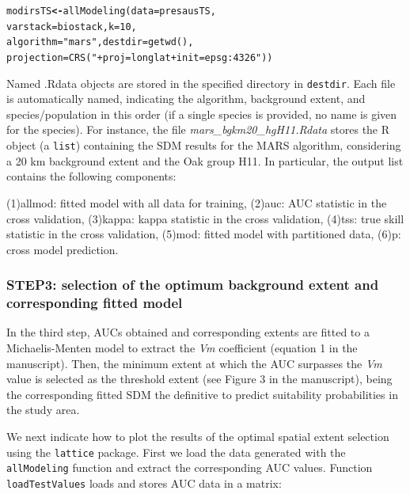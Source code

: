 \documentclass[10pt,a4paper]{article}\usepackage[]{graphicx}\usepackage[]{color}
\makeatletter
\newcommand{\hlnum}[1]{\textcolor[rgb]{0.533,0,0.133}{#1}}%
\newcommand{\hlstr}[1]{\textcolor[rgb]{0.667,0.267,0}{#1}}%
\newcommand{\hlstd}[1]{\textcolor[rgb]{0,0,0}{#1}}%
\newcommand{\hlkwb}[1]{\textcolor[rgb]{0,0,0.4}{\textbf{#1}}}%
\newcommand{\hlkwc}[1]{\textcolor[rgb]{0,0,0.4}{#1}}%
\newcommand{\hlkwd}[1]{\textcolor[rgb]{0,0.267,0.4}{#1}}%
\newenvironment{kframe}{%
 \def\at@end@of@kframe{}%
 \ifinner\ifhmode%
  \def\at@end@of@kframe{\end{minipage}}%
  \begin{minipage}{\columnwidth}%
 \fi\fi%
 \def\FrameCommand##1{\hskip\@totalleftmargin \hskip-\fboxsep
 \colorbox{shadecolor}{##1}\hskip-\fboxsep
     \hskip-\linewidth \hskip-\@totalleftmargin \hskip\columnwidth}%
 \MakeFramed {\advance\hsize-\width
   \@totalleftmargin\z@ \linewidth\hsize
   \@setminipage}}%
 {\par\unskip\endMakeFramed%
 \at@end@of@kframe}
\newenvironment{knitrout}{}{} %
\makeatother
\begin{document}
\begin{knitrout}
\color{fgcolor}\begin{kframe}
\begin{alltt}
\hlstd{modirsTS} \hlkwb{<-} \hlkwd{allModeling}\hlstd{(}\hlkwc{data} \hlstd{= presausTS,}
                     \hlkwc{varstack} \hlstd{= biostack,} \hlkwc{k} \hlstd{=} \hlnum{10}\hlstd{,}
                     \hlkwc{algorithm} \hlstd{=} \hlstr{"mars"}\hlstd{,} \hlkwc{destdir} \hlstd{=} \hlkwd{getwd}\hlstd{(),}
                \hlkwc{projection} \hlstd{=} \hlkwd{CRS}\hlstd{(}\hlstr{"+proj=longlat +init=epsg:4326"}\hlstd{))}
\end{alltt}
\end{kframe}
\end{knitrout}

Named .Rdata objects are stored in the specified directory in \texttt{destdir}. Each file is automatically named, indicating the algorithm, background extent, and species/population in this order (if a single species is provided, no name is given for the species). For instance, the file \textit{mars\_bgkm20\_hgH11.Rdata} stores the R object (a \texttt{list}) containing the SDM results for the MARS algorithm, considering a 20 km background extent and the Oak group H11. In particular, the output list contains the following components:

	(1)allmod: fitted model with all data for training, 
	(2)auc: AUC statistic in the cross validation,
	(3)kappa: kappa statistic in the cross validation,
	(4)tss: true skill statistic in the cross validation,
	(5)mod: fitted model with partitioned data, 
	(6)p: cross model prediction. 

\subsubsection{STEP3: selection of the optimum background extent and corresponding fitted model}

In the third step, AUCs obtained and corresponding extents are fitted to a Michaelis-Menten model to extract the \textit{Vm} coefficient (equation 1 in the manuscript). Then, the minimum extent at which the AUC surpasses the \textit{Vm} value is selected as the threshold extent (see Figure 3 in the manuscript), being the corresponding fitted SDM the definitive to predict suitability probabilities in the study area.

We next indicate how to plot the results of the optimal spatial extent selection using the \texttt{lattice} package. First we load the data generated with the \texttt{allModeling} function and extract the corresponding AUC values. Function \texttt{loadTestValues} loads and stores AUC data in a matrix:
\end{document}

